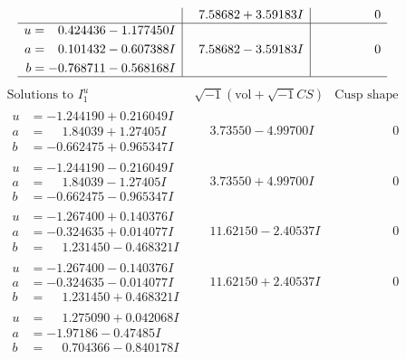 \documentclass[1p]{elsarticle_modified}
\theoremstyle{definition}
\newcommand{\I}{\sqrt{-1}}
\begin{document}
$$\begin{array}{c|c|c}
 & \phantom{-}7.58682 + 3.59183 I & \phantom{-0.000000 } 0 \\ \hline\begin{aligned}
u &= \phantom{-}0.424436 - 1.177450 I \\
a &= \phantom{-}0.101432 - 0.607388 I \\
b &= -0.768711 - 0.568168 I\end{aligned}
 & \phantom{-}7.58682 - 3.59183 I & \phantom{-0.000000 } 0\\
 \hline 
 \end{array}$$\newpage$$\begin{array}{c|c|c}  
\text{Solutions to }I^u_{1}& \I (\text{vol} + \sqrt{-1}CS) & \text{Cusp shape}\\
 \hline 
\begin{aligned}
u &= -1.244190 + 0.216049 I \\
a &= \phantom{-}1.84039 + 1.27405 I \\
b &= -0.662475 + 0.965347 I\end{aligned}
 & \phantom{-}3.73550 - 4.99700 I & \phantom{-0.000000 } 0 \\ \hline\begin{aligned}
u &= -1.244190 - 0.216049 I \\
a &= \phantom{-}1.84039 - 1.27405 I \\
b &= -0.662475 - 0.965347 I\end{aligned}
 & \phantom{-}3.73550 + 4.99700 I & \phantom{-0.000000 } 0 \\ \hline\begin{aligned}
u &= -1.267400 + 0.140376 I \\
a &= -0.324635 + 0.014077 I \\
b &= \phantom{-}1.231450 - 0.468321 I\end{aligned}
 & \phantom{-}11.62150 - 2.40537 I & \phantom{-0.000000 } 0 \\ \hline\begin{aligned}
u &= -1.267400 - 0.140376 I \\
a &= -0.324635 - 0.014077 I \\
b &= \phantom{-}1.231450 + 0.468321 I\end{aligned}
 & \phantom{-}11.62150 + 2.40537 I & \phantom{-0.000000 } 0 \\ \hline\begin{aligned}
u &= \phantom{-}1.275090 + 0.042068 I \\
a &= -1.97186 - 0.47485 I \\
b &= \phantom{-}0.704366 - 0.840178 I\end{aligned}

\end{array}$$
\end{document}
